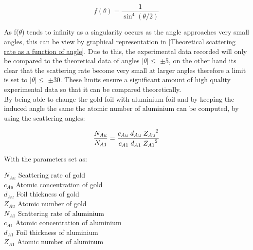 \documentclass[12pt]{article}
\begin{document}
\begin{equation}
f(\theta) = \dfrac{1}{\sin^4(\theta / 2)}
\label{SR Function}
\end{equation} 

As f($\theta$) tends to infinity as a singularity occurs as the angle approaches very small angles, this can be view by graphical representation in \cref{Theoretical scattering rate as a function of angle}. Due to this, the experimental data recorded will only be compared to the theoretical data of angles |$\theta$|$\leq$ $\pm$5\textdegree, on the other hand its clear that the scattering rate become very small at larger angles therefore a limit is set to |$\theta$|$\leq$ $\pm$30\textdegree. These limits ensure a significant amount of high quality experimental data so that it can be compared theoretically. \\

By being able to change the gold foil with aluminium foil and by keeping the induced angle the same the atomic number of aluminium can be computed, by using the scattering angles:

\begin{equation}
\dfrac{N_{Au}}{N_{A1}} = \dfrac{c_{Au} \hspace{0.1cm} d_{Au} \hspace{0.1cm} {Z_{Au}}^2}{c_{A1} \hspace{0.1cm} d_{A1} \hspace{0.1cm} {Z_{A1}}^2}
\label{Atom Eq}
\end{equation} 

With the parameters set as:
\begin{multicols}{2}
    $N_{Au}$ \hspace{0.1cm} Scattering rate of gold \\
    $c_{Au}$ \hspace{0.1cm} Atomic concentration of gold \\
    $d_{Au}$ \hspace{0.1cm} Foil thickness of gold \\
    $Z_{Au}$ \hspace{0.1cm} Atomic number of gold \\
    $N_{A1}$ \hspace{0.1cm} Scattering rate of aluminium \\
    $c_{A1}$ \hspace{0.1cm} Atomic concentration of aluminium \\
    $d_{A1}$ \hspace{0.1cm} Foil thickness of aluminium \\
    $Z_{A1}$ \hspace{0.1cm} Atomic number of aluminum 
\end{multicols}
\vspace{0.5cm}
\end{document}
